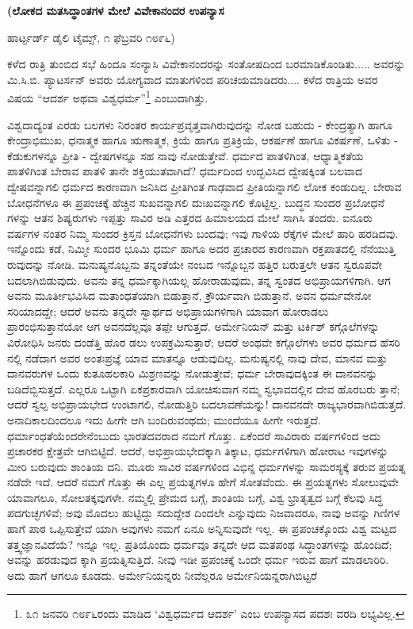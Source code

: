 \begin{center}
\textbf{(ಲೋಕದ ಮತಸಿದ್ಧಾಂತಗಳ ಮೇಲೆ ವಿವೇಕಾನಂದರ ಉಪನ್ಯಾಸ}
\end{center}

\begin{center}
ಹಾರ್ಟ್ಫರ್ಡ್ ಡೈಲಿ ಟೈಮ್ಸ್, ೧ ಫೆಬ್ರವರಿ ೧೮೯೬)
\end{center}

ಕಳೆದ ರಾತ್ರಿ ತುಂಬಿದ ಸಭೆ ಹಿಂದೂ ಸಂನ್ಯಾಸಿ ವಿವೇಕಾನಂದರನ್ನು ಸಂತೋಷದಿಂದ ಬರಮಾಡಿಕೊಂಡಿತು..... ಅವರನ್ನು ಮಿ.ಸಿ.ಬಿ. ಪ್ಯಾಟರ್ಸನ್ ಅವರು ಯೋಗ್ಯವಾದ ಮಾತುಗಳಿಂದ ಪರಿಚಯಮಾಡಿದರು.... ಕಳೆದ ರಾತ್ರಿಯ ಅವರ ವಿಷಯ “ಆದರ್ಶ ಅಥವಾ ವಿಶ್ವಧರ್ಮ”\footnote{೩೧ ಜನವರಿ ೧೮೯೬ರಂದು ಮಾಡಿದ ‘ವಿಶ್ವಧರ್ಮದ ಆದರ್ಶ’ ಎಂಬ ಉಪನ್ಯಾಸದ ಪದಶಃ ವರದಿ ಲಭ್ಯವಿಲ್ಲ.} ಎಂಬುದಾಗಿತ್ತು.

ವಿಶ್ವದಾದ್ಯಂತ ಎರಡು ಬಲಗಳು ನಿರಂತರ ಕಾರ್ಯಪ್ರವೃತ್ತವಾಗಿರುವುದನ್ನು ನೋಡ ಬಹುದು - ಕೇಂದ್ರತ್ಯಾಗಿ ಹಾಗೂ ಕೇಂದ್ರಾಭಿಮುಖ, ಧನಾತ್ಮಕ ಹಾಗೂ ಋಣಾತ್ಮಕ, ಕ್ರಿಯೆ ಹಾಗೂ ಪ್ರತಿಕ್ರಿಯೆ, ಆಕರ್ಷಣೆ ಹಾಗೂ ವಿಕರ್ಷಣೆ, ಒಳಿತು - ಕೆಡುಕುಗಳನ್ನೂ ಪ್ರೀತಿ - ದ್ವೇಷಗಳನ್ನೂ ಸಹ ನಾವು ನೋಡುತ್ತೇವೆ. ಧರ್ಮದ ಪಾತಳಿಗಿಂತ, ಆಧ್ಯಾತ್ಮಿಕತೆಯ ಪಾತಳಿಗಿಂತ ಬೇರಾವ ಪಾತಳಿ ತಾನೇ ಶಕ್ತಿಯುತವಾಗಿದೆ? ಧರ್ಮದಿಂದ ಉದ್ಭವಿಸಿದ ದ್ವೇಷಕ್ಕಿಂತ ಬಲವಾದ ದ್ವೇಷವನ್ನಾಗಲಿ ಧರ್ಮದ ಕಾರಣವಾಗಿ ಜನಿಸಿದ ಪ್ರೀತಿಗಿಂತ ಗಾಢವಾದ ಪ್ರೀತಿಯನ್ನಾಗಲಿ ಲೋಕ ಕಂಡುದಿಲ್ಲ. ಬೇರಾವ ಬೋಧನೆಗಳೂ ಈ ಪ್ರಪಂಚಕ್ಕೆ ಹೆಚ್ಚಿನ ಸುಖವನ್ನಾಗಲಿ ದುಃಖವನ್ನಾಗಲಿ ಕೊಟ್ಟಿಲ್ಲ. ಬುದ್ಧನ ಸುಂದರ ಪ್ರಬೋಧನೆ ಗಳನ್ನು ಆತನ ಶಿಷ್ಯರುಗಳು ಇಪ್ಪತ್ತು ಸಾವಿರ ಅಡಿ ಎತ್ತರದ ಹಿಮಾಲಯದ ಮೇಲೆ ಸಾಗಿಸಿ ತಂದರು. ಐನೂರು ವರ್ಷಗಳ ನಂತರ ನಿಮ್ಮ ಸುಂದರ ಕ್ರಿಸ್ತನ ಬೋಧನೆಗಳು ಬಂದವು; ಇವು ಗಾಳಿಯ ರೆಕ್ಕೆಗಳ ಮೇಲೆ ಹಾರಿ ಹರಡಿದವು. ಇನ್ನೊಂದು ಕಡೆ, ನಿಮ್ಮೀ ಸುಂದರ ಭೂಮಿ ಧರ್ಮ ಹಾಗೂ ಅದರ ಪ್ರಚಾರದ ಕಾರಣವಾಗಿ ರಕ್ತಪಾತದಲ್ಲಿ ನೆನೆಯುತ್ತಿ ರುವುದನ್ನು ನೋಡಿ. ಮನುಷ್ಯನೊಬ್ಬನು ತನ್ನಂತೆಯೇ ನಂಬದ ಇನ್ನೊಬ್ಬನ ಹತ್ತಿರ ಬರುತ್ತಲೇ ಆತನ ಸ್ವರೂಪವೇ ಬದಲಾಗಿಬಿಡುವುದು. ಅವನು ತನ್ನ ಧರ್ಮಕ್ಕಾಗಿಯಲ್ಲ ಹೋರಾಡುವುದು, ತನ್ನ ಸ್ವಂತದ ಅಭಿಪ್ರಾಯಗಳಿಗಾಗಿ. ಆಗ ಅವನು ಮೂರ್ತೀಭವಿಸಿದ ಮತಾಂಧತೆಯಾಗಿ ಬಿಡುತ್ತಾನೆ, ಕ್ರೌರ್ಯವಾಗಿ ಬಿಡುತ್ತಾನೆ. ಅವನ ಧರ್ಮವೇನೋ ಸರಿಯಾದದ್ದೇ; ಆದರೆ ಅವನು ತನ್ನದೇ ಸ್ವಾರ್ಥದ ಅಭಿಪ್ರಾಯಗಳಿಗಾಗಿ ಯಾವಾಗ ಹೋರಾಡಲು ಪ್ರಾರಂಭಿಸುತ್ತಾನೆಯೋ ಆಗ ಅವನದೆಲ್ಲವೂ ತಪ್ಪೇ ಆಗುತ್ತದೆ. ಅರ್ಮೇನಿಯನ್ ಮತ್ತು ಟರ್ಕಿಶ್ ಕಗ್ಗೊಲೆಗಳನ್ನು ವಿರೋಧಿಸಿ ಜನರು ದಂಡೆತ್ತಿ ಹೊರ ಡಲು ಉಪಕ್ರಮಿಸುತ್ತಾರೆ; ಆದರೆ ಅಂಥವೇ ಕಗ್ಗೊಲೆಗಳು ಅವರ ಧರ್ಮದ ಹೆಸರಿ ನಲ್ಲಿ ನಡೆದಾಗ ಅವರ ಅಂತಃಪ್ರಜ್ಞೆ ಯಾವ ಮಾತನ್ನೂ ಆಡುವುದಿಲ್ಲ. ಮನುಷ್ಯನಲ್ಲಿ ನಾವು ದೇವ, ಮಾನವ ಮತ್ತು ದಾನವರುಗಳ ಒಂದು ಕುತೂಹಲಕಾರಿ ಮಿಶ್ರಣವನ್ನು ನೋಡುತ್ತೇವೆ; ಧರ್ಮ ಬೇರಾವುದಕ್ಕಿಂತ ಈ ದಾನವನನ್ನು ಬಡಿದೆಬ್ಬಿಸುತ್ತದೆ. ಎಲ್ಲರೂ ಒಟ್ಟಾಗಿ ಏಕಪ್ರಕಾರವಾಗಿ ಯೋಚಿಸುವಾಗ ನಮ್ಮ ಸ್ವಭಾವದಲ್ಲಿನ ದೇವ ಹೊರಬರು ತ್ತಾನೆ; ಆದರೆ ಸ್ವಲ್ಪ ಅಭಿಪ್ರಾಯಭೇದ ಉಂಟಾಗಲಿ, ನೋಡುತ್ತಿರಿ ಬದಲಾವಣೆಯನ್ನು! ದಾನವನದೇ ರಾಜ್ಯಭಾರವಾಗಿಬಿಡುತ್ತದೆ. ಅನಾದಿಕಾಲದಿಂದಲೂ ಇದು ಹೀಗೇ ಆಗಿ ಬಂದಿರುವಂಥದು; ಮುಂದೆಯೂ ಹೀಗೇ ಇರುತ್ತದೆ. ಧರ್ಮಾಂಧತೆಯೆಂದರೇನೆಂಬುದು ಭಾರತದವರಾದ ನಮಗೆ ಗೊತ್ತು. ಏಕೆಂದರೆ ಸಾವಿರಾರು ವರ್ಷಗಳಿಂದ ಅದು ಪ್ರಚಾರಕರ ಕ್ಷೇತ್ರವೇ ಆಗಿಬಿಟ್ಟಿದೆ. ಆದರೆ, ಅಭಿಪ್ರಾಯಭೇದಕ್ಕಾಗಿ ತಿಕ್ಕಾಟ, ಧರ್ಮಗಳಿಗಾಗಿ ಹೋರಾಟ ಇವುಗಳನ್ನು ಮೀರಿ ಬರುವುದು ಶಾಂತಿಯ ದನಿ. ಮೂರು ಸಾವಿರ ವರ್ಷಗಳಿಂದ ವಿಭಿನ್ನ ಧರ್ಮಗಳನ್ನು ಸಾಮರಸ್ಯಕ್ಕೆ ತರುವ ಪ್ರಯತ್ನ ನಡೆದೇ ಇದೆ. ಆದರೆ ನಮಗೆ ಗೊತ್ತು ಈ ಎಲ್ಲ ಪ್ರಯತ್ನಗಳೂ ಹೇಗೆ ಸೋತವೆಂದು. ಈ ಪ್ರಯತ್ನಗಳು ಸೋಲುವುವೇ ಯಾವಾಗಲೂ, ಸೋಲತಕ್ಕವುಗಳೇ. ನಮ್ಮಲ್ಲಿ ಪ್ರೇಮದ ಬಗ್ಗೆ, ಶಾಂತಿಯ ಬಗ್ಗೆ, ವಿಶ್ವ ಭ್ರಾತೃತ್ವದ ಬಗ್ಗೆ ಕೆಲವು ಸಿದ್ಧ ಪದಗುಚ್ಛಗಳಿವೆ; ಅವು ಮೊದಲು ಹುಟ್ಟಿದ್ದು ಸದುದ್ದೇಶ ದಿಂದಲೇ ಎನ್ನುವುದು ನಿಜವಾದರೂ, ನಾವು ಅವನ್ನು ಗಿಣಿಗಳ ಹಾಗೆ ಪಾಠ ಒಪ್ಪಿಸುತ್ತೇವೆ ಯಾಗಿ ಅವುಗಳು ನಮಗೆ ಏನೂ ಅನ್ನಿಸುವುದೇ ಇಲ್ಲ. ಈ ಪ್ರಪಂಚಕ್ಕೊಂದು ವಿಶ್ವ ಮಟ್ಟದ ತತ್ತ್ವಜ್ಞಾನವಿದೆಯೆ? ಇನ್ನೂ ಇಲ್ಲ. ಪ್ರತಿಯೊಂದು ಧರ್ಮವೂ ತನ್ನದೇ ಆದ ಮತಪಂಥ ಸಿದ್ಧಾಂತಗಳನ್ನು ಹೊಂದಿದೆ; ಅವನ್ನು ಹರಡುವುದ ಕ್ಕಾಗಿ ಪ್ರಯತ್ನಿಸುತ್ತಿದೆ. ನೀವು ಇಡೀ ಪ್ರಪಂಚಕ್ಕೆ ಒಂದೇ ಧರ್ಮ ಇರುವ ಹಾಗೆ ಮಾಡಲಾರಿರಿ. ಅದು ಹಾಗೆ ಆಗಲೂ ಕೂಡದು. ಅರ್ಮೇನಿಯನ್ನರು ನೀವೆಲ್ಲರೂ ಅರ್ಮೇನಿಯನ್ನರಾಗಿಬಿಟ್ಟರೆ 